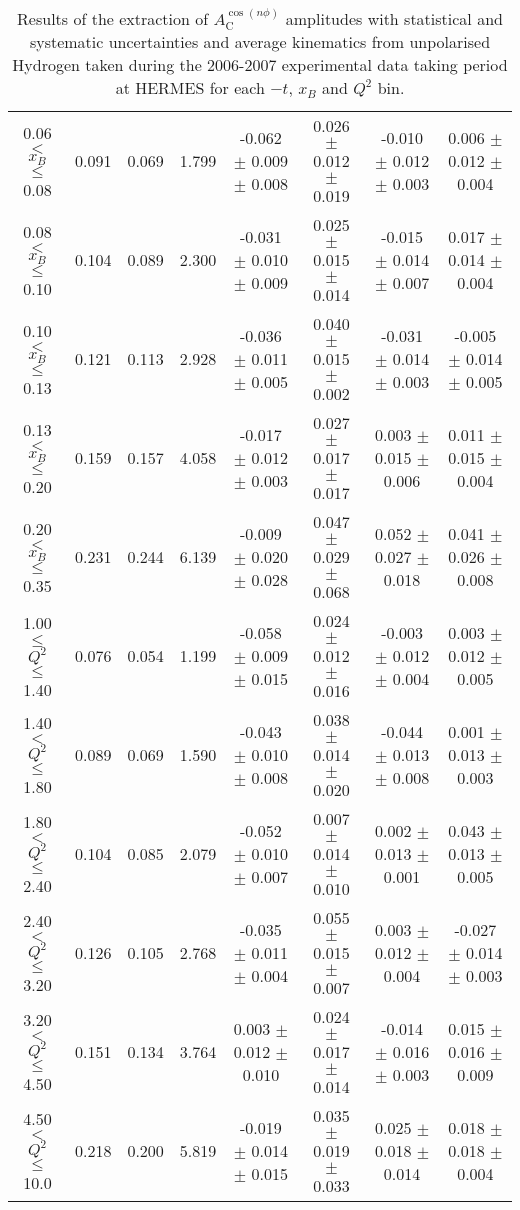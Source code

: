 \begin{table}[width=15cm]
\begin{center}
{\begin{tabular}{|c|c|c|c|c|c|c|c|}
0.06 $<$ $x_{B}$ $\leqslant$ 0.08 &  0.091 & 0.069 &  1.799 &   -0.062  $\pm$  0.009  $\pm$   0.008 &
0.026  $\pm$  0.012  $\pm$   0.019 & -0.010  $\pm$ 0.012  $\pm$   0.003 & 0.006   $\pm$  0.012   $\pm$   0.004\\
0.08 $<$ $x_{B}$ $\leqslant$ 0.10 &  0.104 & 0.089 &  2.300 &  -0.031  $\pm$  0.010  $\pm$   0.009 & 
0.025  $\pm$  0.015  $\pm$   0.014 & -0.015 $\pm$  0.014 $\pm$    0.007 & 0.017   $\pm$  0.014    $\pm$  0.004\\
0.10 $<$ $x_{B}$ $\leqslant$ 0.13 &  0.121 &  0.113 &  2.928 &  -0.036  $\pm$  0.011  $\pm$   0.005 & 
0.040  $\pm$  0.015 $\pm$   0.002 & -0.031 $\pm$  0.014  $\pm$   0.003 & -0.005   $\pm$  0.014  $\pm$    0.005\\
0.13 $<$ $x_{B}$ $\leqslant$ 0.20 &  0.159 & 0.157 &  4.058&   -0.017   $\pm$ 0.012  $\pm$   0.003 & 
0.027  $\pm$  0.017 $\pm$    0.017 & 0.003  $\pm$  0.015  $\pm$   0.006 & 0.011   $\pm$  0.015   $\pm$  0.004\\
0.20 $<$ $x_{B}$ $\leqslant$ 0.35 &  0.231 & 0.244 &  6.139 &  -0.009 $\pm$  0.020   $\pm$  0.028 & 
0.047  $\pm$  0.029   $\pm$    0.068 & 0.052  $\pm$  0.027  $\pm$   0.018 & 0.041  $\pm$   0.026  $\pm$   0.008\\
\hline
1.00 $\leqslant$ $Q^{2}$ $\leqslant$ 1.40 &  0.076 & 0.054  & 1.199 &  -0.058  $\pm$  0.009  $\pm$   0.015 & 
0.024  $\pm$  0.012  $\pm$   0.016 &  -0.003 $\pm$  0.012  $\pm$  0.004 & 0.003  $\pm$  0.012   $\pm$   0.005\\
1.40 $<$ $Q^{2}$ $\leqslant$ 1.80 &  0.089 & 0.069 &  1.590 &  -0.043  $\pm$  0.010  $\pm$   0.008 & 
0.038  $\pm$  0.014  $\pm$   0.020 & -0.044  $\pm$  0.013  $\pm$  0.008 & 0.001  $\pm$  0.013   $\pm$  0.003\\
1.80 $<$ $Q^{2}$ $\leqslant$ 2.40 &  0.104 & 0.085 &  2.079 &  -0.052  $\pm$  0.010  $\pm$   0.007 &
 0.007  $\pm$  0.014  $\pm$   0.010 & 0.002 $\pm$   0.013  $\pm$  0.001 & 0.043  $\pm$   0.013  $\pm$  0.005\\
2.40 $<$ $Q^{2}$ $\leqslant$ 3.20 &  0.126 & 0.105  & 2.768 &  -0.035 $\pm$   0.011  $\pm$   0.004 &  
0.055  $\pm$  0.015  $\pm$   0.007 & 0.003  $\pm$  0.012  $\pm$  0.004 & -0.027  $\pm$  0.014  $\pm$  0.003\\
3.20 $<$ $Q^{2}$ $\leqslant$ 4.50 &  0.151 & 0.134 &  3.764 &  0.003  $\pm$  0.012   $\pm$  0.010 & 
0.024 $\pm$   0.017  $\pm$   0.014 & -0.014  $\pm$  0.016 $\pm$ 0.003 & 0.015   $\pm$  0.016  $\pm$  0.009\\
4.50 $<$ $Q^{2}$ $\leqslant$ 10.0 &  0.218 & 0.200 &  5.819 &  -0.019  $\pm$  0.014  $\pm$   0.015 & 
0.035  $\pm$  0.019  $\pm$  0.033 & 0.025 $\pm$   0.018  $\pm$  0.014 & 0.018   $\pm$  0.018   $\pm$   0.004\\
\hline
  \end{tabular}
}
 \end{center}
\caption{Results of the extraction of $A_{\textrm{C}}^{\cos(n\phi)}$  amplitudes with statistical and systematic uncertainties and average kinematics from unpolarised Hydrogen taken during
the 2006-2007 experimental data taking period at HERMES for each $-t$, $x_{B}$ and $Q^{2}$ bin.}
\end{table}

